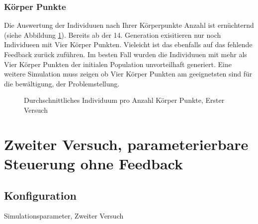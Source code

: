   \subsubsection{Körper Punkte\label{subsub:bp}}
    Die Auswertung der Individuuen nach Ihrer Körperpunkte Anzahl ist ernüchternd (siehe Abbildung \ref{fig:graphBpFirst}).
    Bereits ab der 14. Generation exisitieren nur noch Individueen mit Vier Körper Punkten.
    Vieleicht ist das ebenfalls auf das fehlende Feedback zurück zuführen. Im besten Fall
    wurden die Individuuen mit mehr als Vier Körper Punkten der initialen Population unvorteilhaft generiert.
    Eine weitere Simulation muss zeigen ob Vier Körper Punkten am geeignetsten sind für die bewältigung,
    der Problemstellung.
  \begin{figure}
    
    \caption{Durchschnittliches Individuum pro Anzahl Körper Punkte, Erster Versuch}
    \label{fig:graphBpFirst}
  \end{figure}

  \section{Zweiter Versuch, parameterierbare Steuerung ohne Feedback}

    \subsection{Konfiguration}
      \begin{table}[H]
        
        \caption{Simulationsparameter, Zweiter Versuch}
      \end{table}
